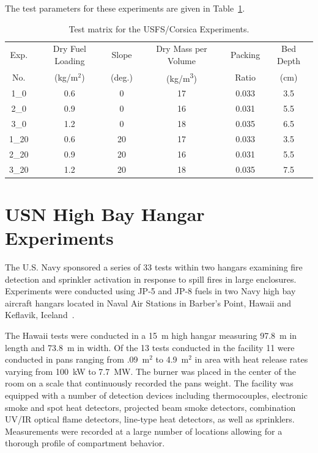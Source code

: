 The test parameters for these experiments are given in Table~\ref{Corsica_Parameters}.

\begin{table}[ht!]
\centering
\caption[Test matrix for the USFS/Corsica Experiments]
{Test matrix for the USFS/Corsica Experiments.}
\label{Corsica_Parameters}
\begin{tabular}{|c|c|c|c|c|c|}
\hline
Exp.         & Dry Fuel Loading    & Slope     & Dry Mass per Volume  & Packing & Bed Depth       \\
No.          & (kg/m$^2$)          & (deg.)    & (\unit{kg/m^3})           & Ratio   & (cm)            \\ \hline \hline
1\_0         & 0.6                 & 0         & 17                   & 0.033   & 3.5             \\ \hline
2\_0         & 0.9                 & 0         & 16                   & 0.031   & 5.5             \\ \hline
3\_0         & 1.2                 & 0         & 18                   & 0.035   & 6.5             \\ \hline
1\_20        & 0.6                 & 20        & 17                   & 0.033   & 3.5             \\ \hline
2\_20        & 0.9                 & 20        & 16                   & 0.031   & 5.5             \\ \hline
3\_20        & 1.2                 & 20        & 18                   & 0.035   & 7.5             \\ \hline
\end{tabular}
\end{table}



\section{USN High Bay Hangar Experiments}
\label{USN_High_Bay_Hangar_Description}

The U.S. Navy sponsored a series of 33 tests within two hangars examining fire detection and sprinkler activation in response to spill fires in large enclosures. Experiments were conducted using JP-5 and JP-8 fuels in two Navy high bay aircraft hangars located in Naval Air Stations in Barber's Point, Hawaii and Keflavik, Iceland~\cite{Gott:1}.

The Hawaii tests were conducted in a 15~m high hangar measuring 97.8~m in length and 73.8~m in width. Of the 13 tests conducted in the facility 11 were conducted in pans ranging from .09~m$^2$ to 4.9~m$^2$ in area with heat release rates varying from 100~kW to 7.7~MW. The burner was placed in the center of the room on a scale that continuously recorded the pans weight. The facility was equipped with a number of detection devices including thermocouples, electronic smoke and spot heat detectors, projected beam smoke detectors, combination UV/IR optical flame detectors, line-type heat detectors, as well as sprinklers. Measurements were recorded at a large number of locations allowing for a thorough profile of compartment behavior.

